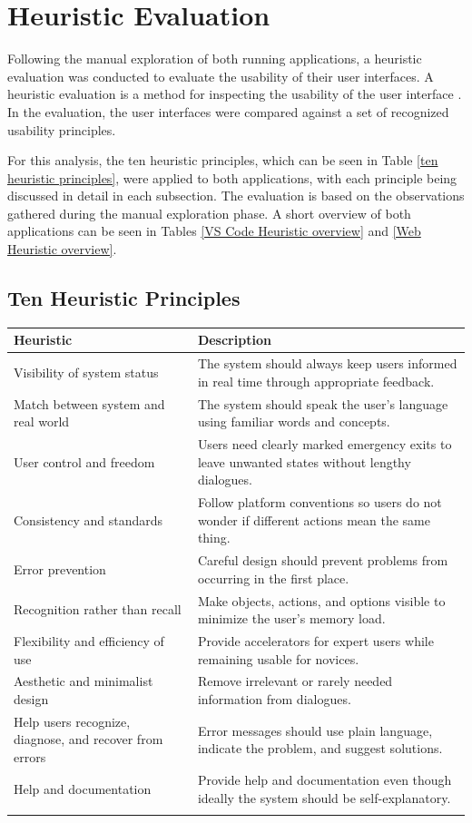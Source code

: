 \documentclass{article}
\begin{document}
\section{Heuristic Evaluation}
Following the manual exploration of both running applications, a heuristic evaluation was conducted to evaluate the usability of their user interfaces. A heuristic evaluation is a method for inspecting the usability of the user interface \cite{nielsen1994}. In the evaluation, the user interfaces were compared against a set of recognized usability principles.

For this analysis, the ten heuristic principles, which can be seen in Table \ref{ten heuristic principles}, were applied to both applications, with each principle being discussed in detail in each subsection. The evaluation is based on the observations gathered during the manual exploration phase. A short overview of both applications can be seen in Tables \ref{VS Code Heuristic overview} and \ref{Web Heuristic overview}.

\subsection{Ten Heuristic Principles}
\begin{tabular}{|p{2cm}|p{10cm}|}
\hline
\textbf{Heuristic} & \textbf{Description} \\
\hline
Visibility of system status & The system should always keep users informed in real time through appropriate feedback. \\
\hline
Match between system and real world & The system should speak the user's language using familiar words and concepts. \\
\hline
User control and freedom & Users need clearly marked emergency exits to leave unwanted states without lengthy dialogues. \\
\hline
Consistency and standards & Follow platform conventions so users do not wonder if different actions mean the same thing. \\
\hline
Error prevention & Careful design should prevent problems from occurring in the first place. \\
\hline
Recognition rather than recall & Make objects, actions, and options visible to minimize the user's memory load. \\
\hline
Flexibility and efficiency of use & Provide accelerators for expert users while remaining usable for novices. \\
\hline
Aesthetic and minimalist design & Remove irrelevant or rarely needed information from dialogues. \\
\hline
Help users recognize, diagnose, and recover from errors & Error messages should use plain language, indicate the problem, and suggest solutions. \\
\hline
Help and documentation & Provide help and documentation even though ideally the system should be self-explanatory. \\
\hline
\label{ten heuristic principles}
\end{tabular}
\end{document}

